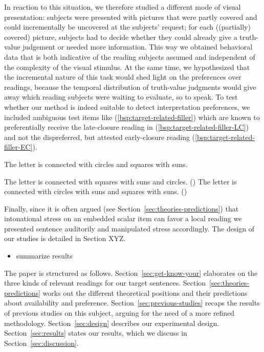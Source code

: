 \documentclass[fleqn,reqno,10pt,draft]{article}
\newcommand{\lc}{\acro{lc}}
\newcommand{\ec}{\acro{ec}}
\newcommand{\LC}{\lc}
\newcommand{\EC}{\ec}
\begin{document}
In reaction to this situation, we therefore studied a different mode
of visual presentation: subjects were presented with pictures that
were partly covered and could incrementally be uncovered at the
subjects' request; for each ((partially) covered) picture, subjects
had to decide whether they could already give a truth-value judgement
or needed more information. This way we
obtained behavioral data that is both indicative of the reading
subjects assumed and independent of the complexity of the visual
stimulus. At the same time, we hypothesized that the incremental
nature of this task would shed light on the preferences over readings,
because the temporal distribution of truth-value judgments would give
away which reading subjects were waiting to evaluate, so to speak. To
test whether our method is indeed suitable to detect interpretation
preferences, we included ambiguous test items like
(\ref{bsp:target-related-filler}) which are known to preferentially
receive the late-closure reading in
(\ref{bsp:target-related-filler-LC}) and not the dispreferred, but
attested early-closure reading
(\ref{bsp:target-related-filler-EC}).

\begin{exe}
\ex \label{bsp:target-related-filler} The letter is connected with circles and squares with
  suns.
  \begin{xlist}
  \ex \label{bsp:target-related-filler-LC} The letter is connected
    with squares with suns and circles. \hfill (\LC)
  \ex \label{bsp:target-related-filler-EC} The letter is connected
    with circles with suns and squares with suns. \hfill (\EC)
  \end{xlist}
\end{exe}

\noindent Finally, since it is often argued (see
Section~\ref{sec:theories-predictions}) that intonational stress on an
embedded scalar item can favor a local reading we presented sentence
auditorily and manipulated stress accordingly. The design of our
studies is detailed in Section XYZ.

\begin{itemize}
\item summarize results
\end{itemize}

The paper is structured as follows. Section~\ref{sec:get-know-your}
elaborates on the three kinds of relevant readings for our target
sentences. Section~\ref{sec:theories-predictions} works out the
different theoretical positions and their predictions about
availability and preference. Section~\ref{sec:previous-studies} recaps
the results of previous studies on this subject, arguing for the need
of a more refined methodology. Section~\ref{sec:design} describes our
experimental design. Section~\ref{sec:results} states our results,
which we discuss in Section~\ref{sec:discussion}.
\end{document}
